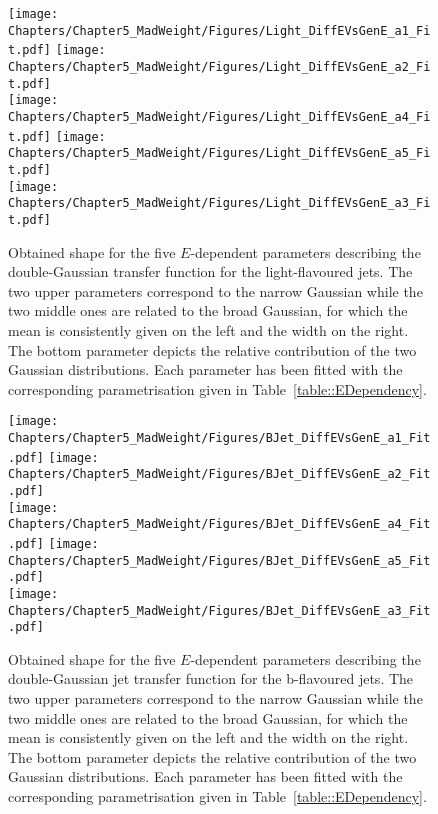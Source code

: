 \begin{figure}[h!tp]
 \centering
 \texttt{[image: Chapters/Chapter5\_MadWeight/Figures/Light\_DiffEVsGenE\_a1\_Fit.pdf]} \hspace{0.2cm}
 \texttt{[image: Chapters/Chapter5\_MadWeight/Figures/Light\_DiffEVsGenE\_a2\_Fit.pdf]} \vspace{0.3cm} \\
 \texttt{[image: Chapters/Chapter5\_MadWeight/Figures/Light\_DiffEVsGenE\_a4\_Fit.pdf]} \hspace{0.2cm}
 \texttt{[image: Chapters/Chapter5\_MadWeight/Figures/Light\_DiffEVsGenE\_a5\_Fit.pdf]} \vspace{0.3cm} \\
 \texttt{[image: Chapters/Chapter5\_MadWeight/Figures/Light\_DiffEVsGenE\_a3\_Fit.pdf]}
 \caption{Obtained shape for the five $E$-dependent parameters describing the double-Gaussian transfer function for the light-flavoured jets. The two upper parameters correspond to the narrow Gaussian while the two middle ones are related to the broad Gaussian, for which the mean is consistently given on the left and the width on the right. The bottom parameter depicts the relative contribution of the two Gaussian distributions. Each parameter has been fitted with the corresponding parametrisation given in Table~\ref{table::EDependency}.} \label{fig::TFLight}
\end{figure}

\begin{figure}[h!tp]
 \centering
 \texttt{[image: Chapters/Chapter5\_MadWeight/Figures/BJet\_DiffEVsGenE\_a1\_Fit.pdf]} \hspace{0.2cm}
 \texttt{[image: Chapters/Chapter5\_MadWeight/Figures/BJet\_DiffEVsGenE\_a2\_Fit.pdf]} \vspace{0.2cm} \\
 \texttt{[image: Chapters/Chapter5\_MadWeight/Figures/BJet\_DiffEVsGenE\_a4\_Fit.pdf]} \hspace{0.2cm}
 \texttt{[image: Chapters/Chapter5\_MadWeight/Figures/BJet\_DiffEVsGenE\_a5\_Fit.pdf]} \vspace{0.2cm} \\
 \texttt{[image: Chapters/Chapter5\_MadWeight/Figures/BJet\_DiffEVsGenE\_a3\_Fit.pdf]}
 \caption{Obtained shape for the five $E$-dependent parameters describing the double-Gaussian jet transfer function for the b-flavoured jets. The two upper parameters correspond to the narrow Gaussian while the two middle ones are related to the broad Gaussian, for which the mean is consistently given on the left and the width on the right. The bottom parameter depicts the relative contribution of the two Gaussian distributions. Each parameter has been fitted with the corresponding parametrisation given in Table~\ref{table::EDependency}.} \label{fig::TFBJet}
\end{figure}


